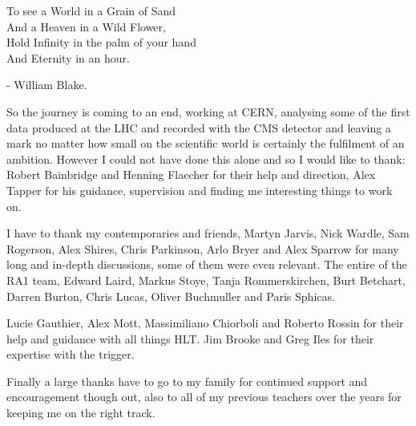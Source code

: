 \begin{preface}
\begin{centering}To see a World in a Grain of Sand\\
And a Heaven in a Wild Flower,\\
Hold Infinity in the palm of your hand \\
And Eternity in an hour.\\
\end{centering}

\begin{flushright}
- William Blake.
\end{flushright}
\end{preface}

\begin{acknowledgements}
So the journey is coming to an end, working at CERN, analysing some of the 
first data produced at the LHC and recorded with the CMS detector and leaving 
a mark no matter how small on the scientific world is certainly the fulfilment 
of an ambition. However I could not have done this alone and so I would like to 
thank: Robert Bainbridge and Henning Flaecher for their help and direction, 
Alex Tapper for his guidance, supervision and finding me interesting things to 
work on.

I have to thank my contemporaries and friends, Martyn Jarvis, Nick Wardle, Sam 
Rogerson, Alex Shires, Chris Parkinson, Arlo Bryer and Alex Sparrow for many 
long and in-depth discussions, some of them were even relevant. The entire of 
the RA1 team, Edward Laird, Markus Stoye, Tanja Rommerskirchen, Burt Betchart, 
Darren Burton, Chris Lucas, Oliver Buchmuller and Paris Sphicas.

Lucie Gauthier, Alex Mott, Massimiliano Chiorboli and Roberto Rossin for their 
help and guidance with all things HLT. Jim Brooke and Greg Iles for their 
expertise with the \Lone trigger.

Finally a large thanks have to go to my family for continued support and 
encouragement though out, also to all of my previous teachers over the years 
for keeping me on the right track.

\end{acknowledgements}

